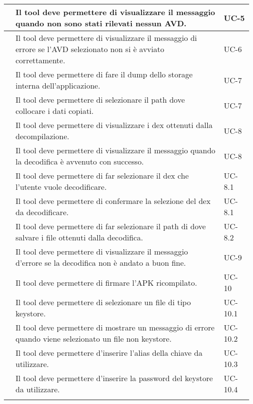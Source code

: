 \begin{center}
\begin{longtable}{ | c| C{7cm} |C{3cm} |}
         &Il tool deve permettere di visualizzare il messaggio quando non sono stati rilevati nessun AVD. & UC-5 \\\hline
         &Il tool deve permettere di visualizzare il messaggio di errore se l'AVD selezionato non si è avviato correttamente.& UC-6 \\\hline
         &Il tool deve permettere di fare il dump dello storage interna dell'applicazione.& UC-7 \\\hline
         & Il tool deve permettere di selezionare il path dove collocare i dati copiati.& UC-7\\\hline
        \setcounter{subCount}{0}

         &Il tool deve permettere di visualizzare i dex ottenuti dalla decompilazione.& UC-8\\\hline
         & Il tool deve permettere di visualizzare il messaggio quando la decodifica è avvenuto con successo.& UC-8\\\hline
         & Il tool deve permettere di far selezionare il dex che l'utente vuole decodificare.& UC-8.1\\\hline
         & Il tool deve permettere di confermare la selezione del dex da decodificare.& UC-8.1\\\hline
         & Il tool deve permettere di far selezionare il path di dove salvare i file ottenuti dalla decodifica.& UC-8.2\\\hline
        \setcounter{subCount}{0}

         &Il tool deve permettere di visualizzare il messaggio d'errore se la decodifica non è andato a buon fine.& UC-9 \\\hline

        & Il tool deve permettere di firmare l'APK ricompilato.& UC-10 \\\hline
         & Il tool deve permettere di selezionare un file di tipo keystore.&UC-10.1\\\hline
        & Il tool deve permettere di mostrare un messaggio di errore quando viene selezionato un file non keystore. & UC-10.2 \\\hline
         & Il tool deve permettere d'inserire l'alias della chiave da utilizzare.& UC-10.3 \\\hline
         & Il tool deve permettere d'inserire la password del keystore da utilizzare.& UC-10.4 \\\hline
        \setcounter{subCount}{0}


\end{longtable}
\end{center}
